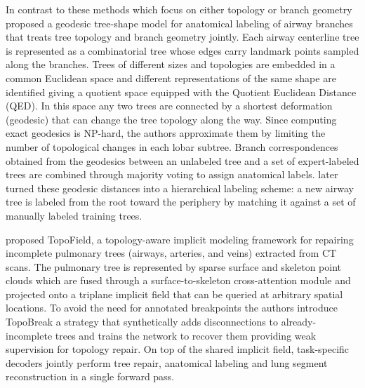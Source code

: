 In contrast to these methods which focus on either topology or branch geometry
\citet{feragen2011airway} proposed a geodesic tree-shape model for anatomical labeling of
airway branches that treats tree topology and branch geometry jointly. Each airway centerline
tree is represented as a combinatorial tree whose edges carry landmark points sampled along
the branches. Trees of different sizes and topologies are embedded in a common Euclidean
space and different representations of the same shape are identified giving a quotient
space equipped with the Quotient Euclidean Distance (QED). In this space any two trees are
connected by a shortest deformation (geodesic) that can change the tree topology along the
way. Since computing exact geodesics is NP-hard, the authors approximate them by limiting the
number of topological changes in each lobar subtree. Branch correspondences obtained from the
geodesics between an unlabeled tree and a set of expert-labeled trees are combined through
majority voting to assign anatomical labels. 
\citet{feragen2012hierarchical} later
turned these geodesic distances into a hierarchical labeling scheme: a new airway tree is
labeled from the root toward the periphery by matching it against a set of manually labeled
training trees.

\citet{weng2026topofield} proposed TopoField, a topology-aware implicit modeling framework for
repairing incomplete pulmonary trees (airways, arteries, and veins) extracted from CT scans.
The pulmonary tree is represented by sparse surface and skeleton point clouds which are fused
through a surface-to-skeleton cross-attention module and projected onto a triplane implicit
field that can be queried at arbitrary spatial locations. To avoid the need for annotated
breakpoints the authors introduce TopoBreak a strategy that synthetically adds
disconnections to already-incomplete trees and trains the network to recover them providing
weak supervision for topology repair. On top of the shared implicit field, task-specific
decoders jointly perform tree repair, anatomical labeling and lung segment reconstruction in
a single forward pass. 


